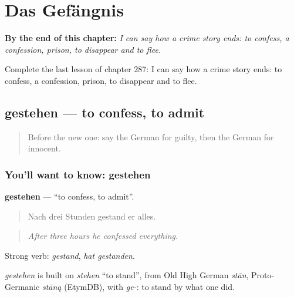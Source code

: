 
\chapter{Das Gefängnis}
\label{ch:ge-das-gefangnis}

\begin{chapteropening}
\textbf{By the end of this chapter:} \emph{I can say how a crime story ends: to confess, a confession, prison, to disappear and to flee.}

Complete the last lesson of chapter 287: I can say how a crime story ends: to confess, a confession, prison, to disappear and to flee.
\end{chapteropening}

\section[gestehen]{gestehen — to confess, to admit}

\label{lesson:GE-C287-gestehen}



\begin{quote}
Before the new one: say the German for guilty, then the German for innocent.
\end{quote}

\subsection*{You'll want to know: gestehen}
\textbf{gestehen} — \textquotedblleft{}to confess, to admit\textquotedblright{}.

\begin{quote}
Nach drei Stunden gestand er alles.
\end{quote}

\begin{quote}
\emph{After three hours he confessed everything.}
\end{quote}

Strong verb: \emph{gestand}, \emph{hat gestanden}.

\begin{cousinweb}
\emph{gestehen} is built on \emph{stehen} \textquotedblleft{}to stand\textquotedblright{}, from Old High German \emph{stān}, Proto-Germanic \emph{stāną} (EtymDB), with \emph{ge-}: to stand by what one did.
\end{cousinweb}

